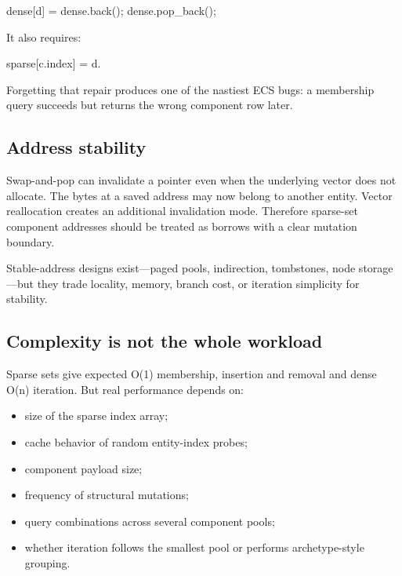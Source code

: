 dense{[}d{]} = dense.back(); dense.pop\_back();

It also requires:

sparse{[}c.index{]} = d.

Forgetting that repair produces one of the nastiest ECS bugs: a membership query succeeds but returns the wrong component row later.

\subsection{Address stability}\label{appendix-8404d0b1a3e7-address-stability}

\hypertarget{appendix-8404d0b1a3e7-address-stability}{}

Swap-and-pop can invalidate a pointer even when the underlying vector does not allocate. The bytes at a saved address may now belong to another entity. Vector reallocation creates an additional invalidation mode. Therefore sparse-set component addresses should be treated as borrows with a clear mutation boundary.

Stable-address designs exist---paged pools, indirection, tombstones, node storage---but they trade locality, memory, branch cost, or iteration simplicity for stability.

\subsection{Complexity is not the whole workload}\label{appendix-8404d0b1a3e7-complexity-is-not-the-whole-workload}

\hypertarget{appendix-8404d0b1a3e7-complexity-is-not-the-whole-workload}{}

Sparse sets give expected O(1) membership, insertion and removal and dense O(n) iteration. But real performance depends on:

\begin{itemize}
\tightlist
\item
  size of the sparse index array;
\item
  cache behavior of random entity-index probes;
\item
  component payload size;
\item
  frequency of structural mutations;
\item
  query combinations across several component pools;
\item
  whether iteration follows the smallest pool or performs archetype-style grouping.
\end{itemize}

